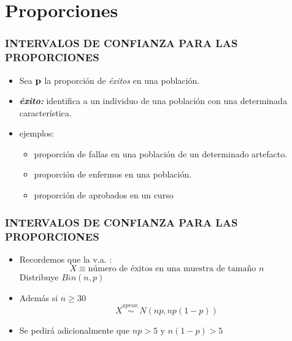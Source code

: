 \documentclass{beamer}
\begin{document}





\section{Proporciones} 

\begin{frame}
\frametitle{INTERVALOS DE CONFIANZA PARA LAS PROPORCIONES}

\begin{itemize}

\item Sea $\bf{p}$ la proporción de \emph{éxitos} en una población.
\item \emph{\textbf{éxito:}} identifica a un individuo de una población con una
determinada característica.
\item ejemplos:
\begin{itemize}
\item proporción de fallas en una población de un
determinado artefacto.
\item proporción de enfermos en una población.
\item proporción de aprobados en un curso
\end{itemize}
\end{itemize}

\end{frame}



\begin{frame}
\frametitle{INTERVALOS DE CONFIANZA PARA LAS PROPORCIONES }
\begin{itemize}
\item Recordemos que la v.a. :
$$X\equiv \text{número de éxitos en una muestra de tamaño } n $$
Distribuye $Bin(n,p)$
\item Además si $n\geq 30$
$$X\stackrel{aprox.}\sim N(np,np(1-p))$$
\item Se pedirá adicionalmente que $np>5$ y $n(1-p)>5$
\end{itemize}
\end{frame}
\end{document}
